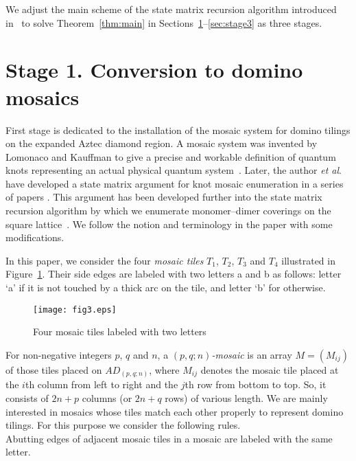 \documentclass[11pt,a4paper]{amsart}
\begin{document}
We adjust the main scheme of the state matrix recursion algorithm introduced in~\cite{OhD1}
to solve Theorem~\ref{thm:main} in Sections~\ref{sec:stage1}--\ref{sec:stage3} as three stages.

 

\section{Stage 1. Conversion to domino mosaics} \label{sec:stage1}

First stage is dedicated to the installation of 
the mosaic system for domino tilings on the expanded Aztec diamond region.
A mosaic system was invented by Lomonaco and Kauffman to give
a precise and workable definition of quantum knots representing
an actual physical quantum system~\cite{LK}.
Later, the author {\em et al\/}. have developed a state matrix argument for knot mosaic enumeration
in a series of papers \cite{HLLO, HO, OHLL, OHLLY}.
This argument has been developed further into the state matrix recursion algorithm
by which we enumerate monomer--dimer coverings on the square lattice~\cite{OhD1}.
We follow the notion and terminology in the paper with some modifications. 


In this paper, we consider the four {\em mosaic tiles\/}  $T_1$, $T_2$, $T_3$ and $T_4$ 
illustrated in Figure~\ref{fig:tile}.
Their side edges are labeled with two letters a and b as follows:
letter `a' if it is not touched by a thick arc on the tile, and letter `b' for otherwise.

\begin{figure}[h]
\texttt{[image: fig3.eps]}
\caption{Four mosaic tiles labeled with two letters}
\label{fig:tile}
\end{figure}

For non-negative integers $p$, $q$ and $n$,
a {\em $(p,q;n)$-mosaic\/} is an array $M = (M_{ij})$ of those tiles placed on $AD_{(p,q;n)}$,
where $M_{ij}$ denotes the mosaic tile placed at the $i$th column from left to right
and the $j$th row from bottom to top. 
So, it consists of $2n + p$ columns (or $2n + q$ rows) of various length.
We are mainly interested in mosaics whose tiles match each other properly to represent  domino tilings.
For this purpose we consider the following rules. \\

Abutting edges of adjacent mosaic tiles in a mosaic are labeled with the same letter.  \\
\end{document}
